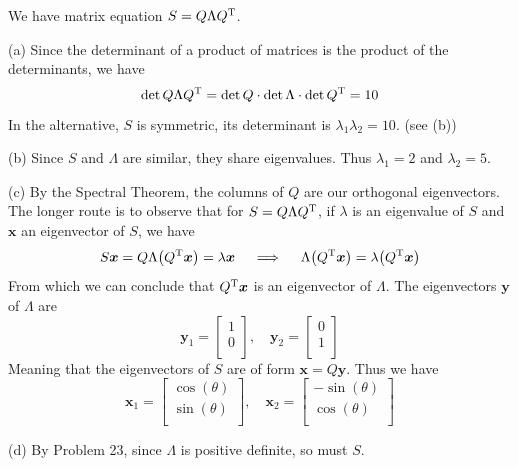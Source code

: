 \documentclass[a4paper]{article}
\begin{document}
We have matrix equation \(S = Q \Lambda Q^{\textsc{T}}\).

(a) Since the determinant of a product of matrices is the product of the determinants, we have 
\[
	\det Q \Lambda Q^{\textsc{T}} = \det Q \cdot \det \Lambda \cdot \det Q^{\textsc{T}} = 10
\]
In the alternative, \(S\) is symmetric, its determinant is \(\lambda_{1}\lambda_{2} = 10\). (see (b))

(b) Since \(S\) and \(\Lambda\) are similar, they share eigenvalues. Thus \(\lambda_{1} = 2\) and \(\lambda_{2} = 5\).

(c) By the Spectral Theorem, the columns of \(Q\) are our orthogonal eigenvectors. The longer route is to observe that for \(S = Q \Lambda Q^{\textsc{T}}\), if \(\lambda\) is an eigenvalue of \(S\) and \(\bm{x}\) an eigenvector of \(S\), we have
\[
	S \bm{x} = Q \Lambda \!\left( Q^{\textsc{T}} \bm{x} \right) = \lambda \bm{x} \quad \implies \quad \Lambda \!\left( Q^{\textsc{T}}\bm{x} \right) = \lambda \!\left( Q^{\textsc{T}}\bm{x} \right) 
\]
From which we can conclude that \(Q^{\textsc{T}}\bm{x}\) is an eigenvector of \(\Lambda\). The eigenvectors \(\bm{y}\) of \(\Lambda\) are
\[
	\bm{y}_{1} = 
	\begin{bmatrix}
		1 \\
		0 \\
	\end{bmatrix},
	\quad
	\bm{y}_{2} =
	\begin{bmatrix}
		0 \\
		1 \\
	\end{bmatrix}
\]
Meaning that the eigenvectors of \(S\) are of form \(\bm{x} = Q \bm{y}\). Thus we have
\[
	\bm{x}_{1} = 
	\begin{bmatrix}
		\cos\left( \theta  \right) \\
		\sin\left( \theta  \right) \\
	\end{bmatrix},
	\quad
	\bm{x}_{2} = 
	\begin{bmatrix}
		-\sin\left( \theta  \right) \\
		\cos\left( \theta  \right) \\
	\end{bmatrix}
\]

(d) By Problem 23, since \(\Lambda\) is positive definite, so must \(S\).

\vspace{12pt}

\end{document}
